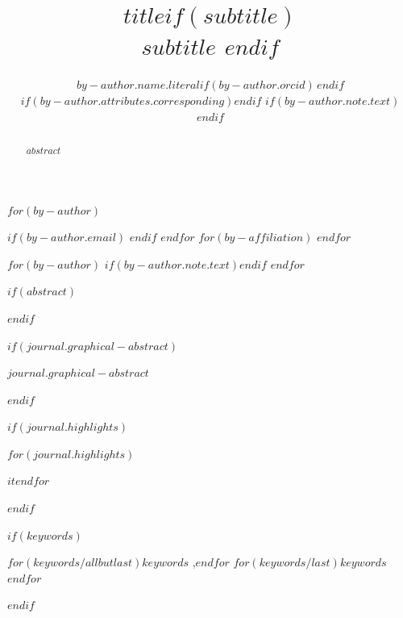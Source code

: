 
\begin{frontmatter}
\title{$title$$if(subtitle)$ \\\large{$subtitle$} $endif$}
$for(by-author)$\author[$for(by-author.affiliations)$$it.number$$sep$,$endfor$]{$by-author.name.literal$$if(by-author.orcid)$\,$endif$%
$if(by-author.attributes.corresponding)$$endif$%
$if(by-author.note.text)$$endif$}
$if(by-author.email)$  $endif$
$endfor$
$for(by-affiliation)$
$endfor$

$for(by-author)$
$if(by-author.note.text)$$endif$
$endfor$
        
$if(abstract)$
\begin{abstract}
$abstract$
\end{abstract}
$endif$

$if(journal.graphical-abstract)$\begin{graphicalabstract}
$journal.graphical-abstract$
\end{graphicalabstract}
$endif$

$if(journal.highlights)$\begin{highlights}
$for(journal.highlights)$\item $it$$endfor$
\end{highlights}
$endif$

$if(keywords)$
\begin{keyword}
    $for(keywords/allbutlast)$$keywords$ \sep $endfor$
    $for(keywords/last)$$keywords$$endfor$
\end{keyword}
$endif$
\end{frontmatter}
    
